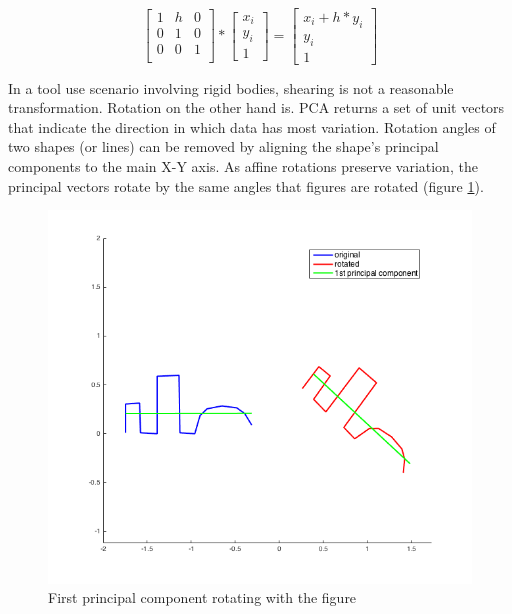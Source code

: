 \documentclass[
    floatsintext
]{article}
\begin{document}
\begin{equation}
  \begin{bmatrix}
    1 & h & 0 \\
    0 & 1 & 0 \\
    0 & 0 & 1   \\ 
  \end{bmatrix} 
  *
  \begin{bmatrix}
    x_i \\ y_i \\ 1
  \end{bmatrix} 
  = 
  \begin{bmatrix}
    x_i + h * y_i \\ y_i \\ 1  
  \end{bmatrix}
  \label{eq:shear}
\end{equation}

In a  tool use scenario involving rigid bodies, shearing is not a reasonable transformation. Rotation on the other hand is. 
PCA returns a set of unit vectors that indicate the direction in which data has most variation. 
Rotation angles of two shapes (or lines) can be removed by aligning the shape's principal components to the main X-Y axis.    
As affine rotations preserve variation, the principal vectors rotate by the same angles that figures are rotated (figure \ref{fig:pca_rotation}).  

\begin{figure}[ht]
  \centering
  \includegraphics[width=.5\textwidth]{./figures/pca_rotation.png}
  \caption{First principal component rotating with the figure}
  \label{fig:pca_rotation}
\end{figure}  
\end{document}
